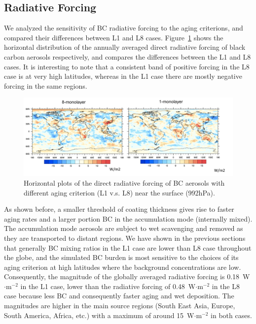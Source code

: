 \documentclass[12pt, fullpage]{uiucthesis2009}
\begin{document}
	
	\subsection{Radiative Forcing }
	We analyzed the sensitivity of BC radiative forcing to the aging criterions, and compared their differences between L1 and L8 cases. Figure~\ref{fig_P23} shows the horizontal distribution of the annually averaged direct radiative forcing of black carbon aerosols respectively, and compares the differences between the L1 and L8 cases. It is interesting to note that a consistent band of positive forcing in the L8 case is at very high latitudes, whereas in the L1 case there are mostly negative forcing in the same regions.
	\begin{figure}[h] 
		\begin{center}
			\includegraphics[width = 1\textwidth]{Figure23}
			\caption[Horizontal plots of the direct radiative forcing of BC aerosols with different aging criterion (L1 v.s. L8) near the surface (992hPa)]{\label{fig_P23} Horizontal plots of the direct radiative forcing of BC aerosols with different aging criterion (L1 v.s. L8) near the surface (992hPa).}
		\end{center}
	\end{figure}
	
	
	As shown before, a smaller threshold of coating thickness gives rise to faster aging rates and a larger portion BC in the accumulation mode (internally mixed). The accumulation mode aerosols are subject to wet scavenging and removed as they are transported to distant regions. We have shown in the previous sections that generally BC mixing ratios in the L1 case are lower than L8 case throughout the globe, and the simulated BC burden is most sensitive to the choices of its aging criterion at high latitudes where the background concentrations are low. Consequently, the magnitude of the globally averaged radiative forcing is 0.18~W$\cdot{\text{m}^{-2}}$ in the L1 case, lower than the radiative forcing of 0.48~W$\cdot{\text{m}^{-2}}$ in the L8 case because less BC and consequently faster aging and wet deposition. The magnitudes are higher in the main source regions (South East Asia, Europe, South America, Africa, etc.) with a maximum of around 15~W$\cdot{\text{m}^{-2}}$ in both cases. 
	
\end{document}
